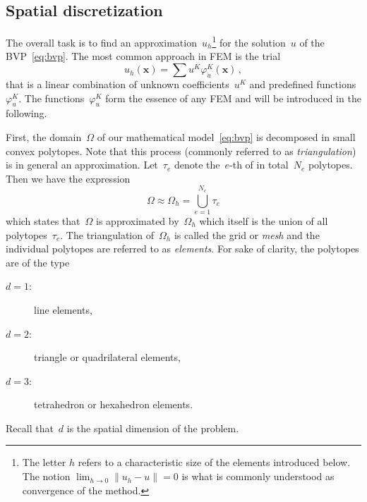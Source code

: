 \documentclass[a4paper,DIV=12,10pt]{scrartcl}
\newcommand{\vek}[1]{\boldsymbol{#1}}  %
\newcommand{\x}[0]{\vek{x}}
\begin{document}
\subsection{Spatial discretization}
\label{sec:spatial}

The overall task is to find an approximation~$u_h$\footnote{The letter
  $h$ refers to a characteristic size of the elements introduced
  below. The notion $\lim_{h\to 0} \|u_h - u\| = 0$ is what is
  commonly understood as convergence of the method.}  for the
solution~$u$ of the BVP~\eqref{eq:bvp}. The most common approach in
FEM is the trial
\begin{equation}
  \label{eq:trial}
  u_h(\x) = \sum u^K \varphi_u^K(\x) \,,
\end{equation}
that is a linear combination of unknown coefficients~$u^K$ and
predefined functions~$\varphi_u^K$. The functions~$\varphi_u^K$ form the essence
of any FEM and will be introduced in the following. 

First, the domain~$\Omega$ of our mathematical model~\eqref{eq:bvp} is
decomposed in small convex polytopes. Note that this process (commonly
referred to as \emph{triangulation}) is in general an
approximation. Let~$\tau_e$ denote the~$e$-th of in total~$N_e$
polytopes. Then we have the expression
\begin{equation}
  \label{eq:domain}
  \Omega \approx \Omega_h = \bigcup_{e=1}^{N_e} \tau_e
\end{equation}
which states that~$\Omega$ is approximated by~$\Omega_h$ which itself
is the union of all polytopes~$\tau_e$. The triangulation
of~$\Omega_h$ is called the grid or \emph{mesh} and the individual
polytopes are referred to as \emph{elements}.  For sake of clarity,
the polytopes are of the type
\begin{description}
\item[$d=1$:] line elements,
\item[$d=2$:] triangle or quadrilateral elements,
\item[$d=3$:] tetrahedron or hexahedron elements.
\end{description}
Recall that~$d$ is the spatial dimension of the problem.
\end{document}
